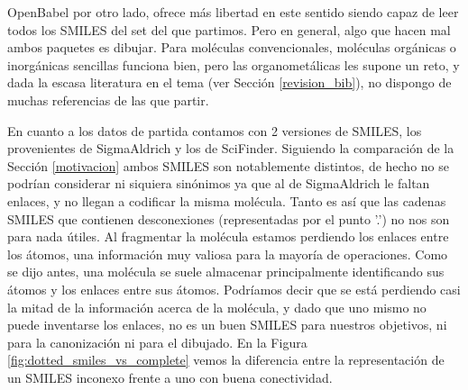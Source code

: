 OpenBabel por otro lado, ofrece más libertad en este sentido siendo capaz de leer todos los SMILES del set del que partimos. Pero en general, algo que hacen mal ambos paquetes es dibujar. Para moléculas convencionales, moléculas orgánicas o inorgánicas sencillas funciona bien, pero las organometálicas les supone un reto, y dada la escasa literatura en el tema (ver Sección \ref{revision_bib}), no dispongo de muchas referencias de las que partir.


En cuanto a los datos de partida contamos con 2 versiones de SMILES, los provenientes de SigmaAldrich y los de SciFinder. Siguiendo la comparación de la Sección \ref{motivacion} ambos SMILES son notablemente distintos, de hecho no se podrían considerar ni siquiera sinónimos ya que al de SigmaAldrich le faltan enlaces, y no llegan a codificar la misma molécula. Tanto es así que las cadenas SMILES que contienen desconexiones (representadas por el punto '.') no nos son para nada útiles. Al fragmentar la molécula estamos perdiendo los enlaces entre los átomos, una información muy valiosa para la mayoría de operaciones. Como se dijo antes, una molécula se suele almacenar principalmente identificando sus átomos y los enlaces entre sus átomos. Podríamos decir que se está perdiendo casi la mitad de la información acerca de la molécula, y dado que uno mismo no puede inventarse los enlaces, no es un buen SMILES para nuestros objetivos, ni para la canonización ni para el dibujado. En la Figura \ref{fig:dotted_smiles_vs_complete} vemos la diferencia entre la representación de un SMILES inconexo frente a uno con buena conectividad.


